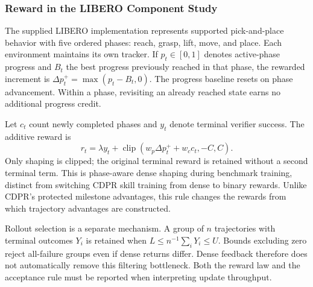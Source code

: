 \subsubsection{Reward in the LIBERO Component Study}\label{sec:dense_method}
The supplied LIBERO implementation represents supported pick-and-place behavior with five ordered phases: reach, grasp, lift, move, and place. Each environment maintains its own tracker. If $p_t\in[0,1]$ denotes active-phase progress and $B_t$ the best progress previously reached in that phase, the rewarded increment is $\Delta p_t^+=\max(p_t-B_t,0)$. The progress baseline resets on phase advancement. Within a phase, revisiting an already reached state earns no additional progress credit.

Let $c_t$ count newly completed phases and $y_t$ denote terminal verifier success. The additive reward is
\begin{equation}
r_t=\lambda y_t+\operatorname{clip}(w_p\Delta p_t^++w_c c_t,-C,C).
\label{eq:dense}
\end{equation}
Only shaping is clipped; the original terminal reward is retained without a second terminal term. This is phase-aware dense shaping during benchmark training, distinct from switching CDPR skill training from dense to binary rewards. Unlike CDPR's protected milestone advantages, this rule changes the rewards from which trajectory advantages are constructed. 

Rollout selection is a separate mechanism. A group of $n$ trajectories with terminal outcomes $Y_i$ is retained when $L\le n^{-1}\sum_iY_i\le U$. Bounds excluding zero reject all-failure groups even if dense returns differ. Dense feedback therefore does not automatically remove this filtering bottleneck. Both the reward law and the acceptance rule must be reported when interpreting update throughput.
